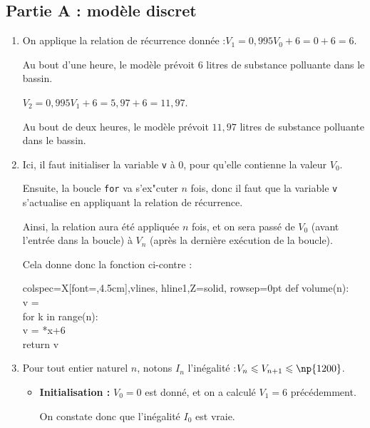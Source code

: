 \subsection*{Partie A : modèle discret}
\begin{enumerate}
	\item On applique la relation de récurrence donnée :\quad $V_1 = 0,995V_0 + 6 = 0 +6 = 6 $.

	Au bout d'une heure, le modèle prévoit 6 litres de substance polluante dans le bassin.

	$V_2 = 0,995V_1 + 6 = 5,97 + 6 = 11,97$.

	Au bout de deux heures, le modèle prévoit $11,97$ litres de substance polluante dans le bassin.

	\item Ici, il faut initialiser la variable \texttt{v} à 0, pour qu'elle contienne la valeur $V_0$.

	Ensuite, la boucle \texttt{for} va s'ex"cuter $n$ fois, donc il faut que la variable \texttt{v} s'actualise en appliquant la relation de récurrence.

	\begin{minipage}[t]{0.6\linewidth}


	Ainsi, la relation aura été appliquée $n$ fois, et on sera passé de $V_0$ (avant l'entrée dans la boucle) à $V_n$ (après la dernière exécution de la boucle).

	Cela donne donc la fonction ci-contre :
	\end{minipage}
	\hfill
		\begin{tblr}[T]{colspec={X[font=\ttfamily,4.5cm]},vlines, hline{1,Z}={solid}, rowsep=0pt}
			def volume(n):\\
			\quad v = {}\\
			\quad for k in range(n):\\
			\quad \quad	v = {*x+6}\\
			\quad return v\\
		\end{tblr}

	\item Pour tout entier naturel $n$, notons $I_n$ l'inégalité :\quad $V_n \leqslant V_{n+1} \leqslant \np{1200}$.

	\begin{itemize}
		\item \textbf{Initialisation :} $V_0 = 0$ est donné, et on a calculé $V_1 = 6$  précédemment.

		On constate donc que l'inégalité $I_0$ est vraie.


\end{itemize}
\end{enumerate}
